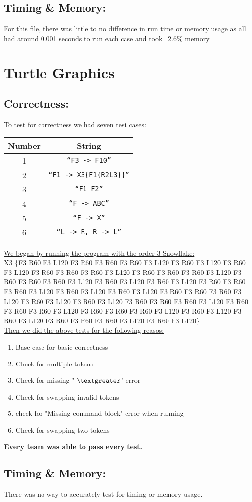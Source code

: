 \documentclass[12pt]{article}
\begin{document}
\subsection{Timing \& Memory:}
For this file, there was little to no difference in run time or memory usage as all had around
0.001 seconds to run each case and took ~2.6\% memory
\newpage

\section{Turtle Graphics}
\subsection{Correctness:}
To test for correctness we had seven test cases:
\begin{table}[H]
	\centering
	\begin{tabular}{cc}
		\toprule
		Number & String \\
		\midrule
		1 & \texttt{``F3 -> F10''} \\
		2 & \texttt{``F1 -> X3\{F1\{R2L3\}\}''} \\
		3 & \texttt{``F1 F2''} \\
		4 & \texttt{``F -> ABC''} \\
		5 & \texttt{``F -> X''} \\
		6 & \texttt{``L -> R, R -> L''} \\
		\bottomrule
	\end{tabular}
\end{table}
\noindent \underline{We began by running the program with the order-3 Snowflake:} \\
X3 \{F3 R60 F3 L120 F3 R60 F3 R60 F3 R60 F3 L120 F3
R60 F3 L120 F3 R60 F3 L120 F3 R60 F3 R60 F3 R60 F3
L120 F3 R60 F3 R60 F3 R60 F3 L120 F3 R60 F3 R60 F3
R60 F3 L120 F3 R60 F3 L120 F3 R60 F3 L120 F3 R60 F3
R60 F3 R60 F3 L120 F3 R60 F3 L120 F3 R60 F3 L120 F3
R60 F3 R60 F3 R60 F3 L120 F3 R60 F3 L120 F3 R60 F3
L120 F3 R60 F3 R60 F3 R60 F3 L120 F3 R60 F3 R60 F3
R60 F3 L120 F3 R60 F3 R60 F3 R60 F3 L120 F3 R60 F3
L120 F3 R60 F3 L120 F3 R60 F3 R60 F3 R60 F3 L120 F3 R60 F3 L120\} \\
\underline{Then we did the above tests for the following reasos:}
\begin{enumerate}
\item Base case for basic correctness
\item Check for multiple tokens
\item Check for missing "-$\textgreater$" error
\item Check for swapping invalid tokens
\item check for "Missing command block" error when running
\item Check for swapping two tokens
\end{enumerate}

\noindent \textbf{Every team was able to pass every test.}

\subsection{Timing \& Memory:}
There was no way to accurately test for timing or memory usage.
\end{document}
